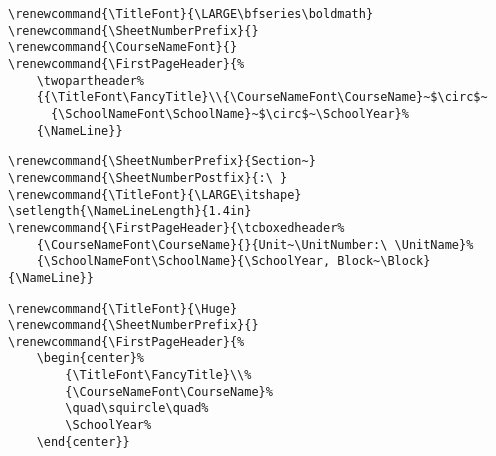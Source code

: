 \documentclass[12pt,twoside,parskip,notitle,showframe]{handout}
\begin{document}
\newpage

\begingroup
\renewcommand{\TitleFont}{\LARGE\bfseries\boldmath}
\renewcommand{\SheetNumberPrefix}{}
\renewcommand{\CourseNameFont}{}
\renewcommand{\FirstPageHeader}{%
	\twopartheader%
	{{\TitleFont\FancyTitle}\\{\CourseNameFont\CourseName}~$\circ$~{\SchoolNameFont\SchoolName}~$\circ$~\SchoolYear}%
	{\NameLine}}
\maketitle
\singlespacing
\begin{verbatim}
\renewcommand{\TitleFont}{\LARGE\bfseries\boldmath}
\renewcommand{\SheetNumberPrefix}{}
\renewcommand{\CourseNameFont}{}
\renewcommand{\FirstPageHeader}{%
    \twopartheader%
    {{\TitleFont\FancyTitle}\\{\CourseNameFont\CourseName}~$\circ$~
      {\SchoolNameFont\SchoolName}~$\circ$~\SchoolYear}%
    {\NameLine}}
\end{verbatim}
\endgroup
\newpage

\begingroup
\renewcommand{\SheetNumberPrefix}{Section~}
\renewcommand{\SheetNumberPostfix}{:\ }
\renewcommand{\TitleFont}{\LARGE\itshape}
\setlength{\NameLineLength}{1.4in}
\renewcommand{\FirstPageHeader}{\tcboxedheader{\CourseNameFont\CourseName}{}{Unit~\UnitNumber:\ \UnitName}{\SchoolNameFont\SchoolName}{\SchoolYear, Block~\Block}{\NameLine}}
\maketitle
\singlespacing
\begin{verbatim}
\renewcommand{\SheetNumberPrefix}{Section~}
\renewcommand{\SheetNumberPostfix}{:\ }
\renewcommand{\TitleFont}{\LARGE\itshape}
\setlength{\NameLineLength}{1.4in}
\renewcommand{\FirstPageHeader}{\tcboxedheader%
    {\CourseNameFont\CourseName}{}{Unit~\UnitNumber:\ \UnitName}%
    {\SchoolNameFont\SchoolName}{\SchoolYear, Block~\Block}{\NameLine}}
\end{verbatim}
\endgroup

\newpage

\begingroup
\renewcommand{\TitleFont}{\Huge}
\renewcommand{\SheetNumberPrefix}{}
\renewcommand{\FirstPageHeader}{%
	\begin{center}%
		{\TitleFont\FancyTitle}\\%
		{\CourseNameFont\CourseName}%
		\quad\squircle\quad%
		\SchoolYear%
	\end{center}}
\maketitle
\singlespacing
\begin{verbatim}
\renewcommand{\TitleFont}{\Huge}
\renewcommand{\SheetNumberPrefix}{}
\renewcommand{\FirstPageHeader}{%
    \begin{center}%
        {\TitleFont\FancyTitle}\\%
        {\CourseNameFont\CourseName}%
        \quad\squircle\quad%
        \SchoolYear%
    \end{center}}
\end{verbatim}
\endgroup
\end{document}
